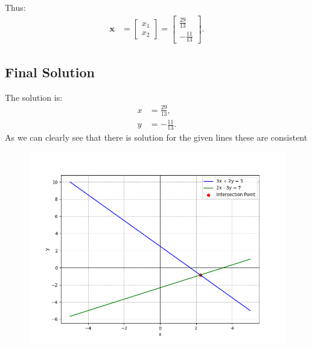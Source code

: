 \documentclass[journal]{IEEEtran}
\begin{document}
	Thus:
	\begin{align}
		\mathbf{x} &= \begin{bmatrix} x_1 \\ x_2 \end{bmatrix} = \begin{bmatrix} \frac{29}{13} \\ -\frac{11}{13} \end{bmatrix}.
	\end{align}
	
	\subsection*{Final Solution}
	The solution is:
	\begin{align}
		x &= \frac{29}{13}, \\
		y &= -\frac{11}{13}.
	\end{align}
	As we can clearly see that there is solution for the given lines these are consistent 
	\begin{figure}[!ht]
		\centering
		\includegraphics[width=\columnwidth]{figs/Fig.png}
		\caption{}
	\end{figure}
\end{document}
